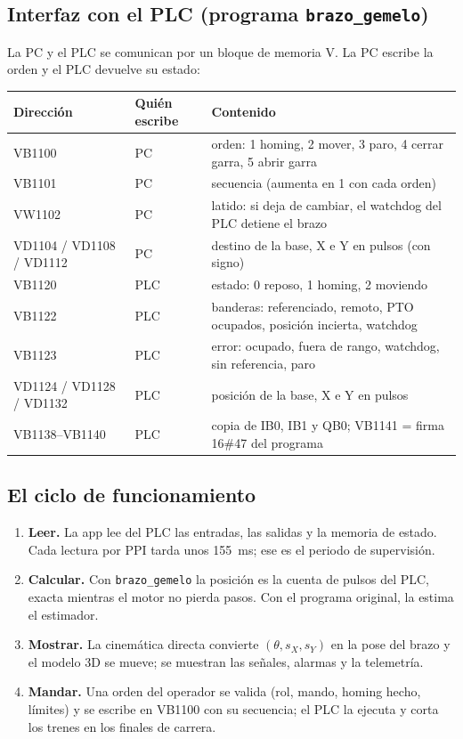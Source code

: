 \documentclass[11pt,a4paper]{article}
\newcommand{\codigo}[1]{\texttt{#1}}
\begin{document}
\subsection{Interfaz con el PLC (programa \codigo{brazo\_gemelo})}
La PC y el PLC se comunican por un bloque de memoria V. La PC escribe la orden y el PLC devuelve su estado:
\begin{center}\small
\begin{tabular}{l l l}
\toprule
\textbf{Dirección} & \textbf{Quién escribe} & \textbf{Contenido}\\
\midrule
VB1100 & PC & orden: 1 homing, 2 mover, 3 paro, 4 cerrar garra, 5 abrir garra\\
VB1101 & PC & secuencia (aumenta en 1 con cada orden)\\
VW1102 & PC & latido: si deja de cambiar, el watchdog del PLC detiene el brazo\\
VD1104 / VD1108 / VD1112 & PC & destino de la base, X e Y en pulsos (con signo)\\
VB1120 & PLC & estado: 0 reposo, 1 homing, 2 moviendo\\
VB1122 & PLC & banderas: referenciado, remoto, PTO ocupados, posición incierta, watchdog\\
VB1123 & PLC & error: ocupado, fuera de rango, watchdog, sin referencia, paro\\
VD1124 / VD1128 / VD1132 & PLC & posición de la base, X e Y en pulsos\\
VB1138--VB1140 & PLC & copia de IB0, IB1 y QB0; VB1141 = firma 16\#47 del programa\\
\bottomrule
\end{tabular}
\end{center}

\subsection{El ciclo de funcionamiento}
\begin{enumerate}
\item \textbf{Leer.} La app lee del PLC las entradas, las salidas y la memoria de estado. Cada lectura por PPI tarda unos 155~ms; ese es el periodo de supervisión.
\item \textbf{Calcular.} Con \codigo{brazo\_gemelo} la posición es la cuenta de pulsos del PLC, exacta mientras el motor no pierda pasos. Con el programa original, la estima el estimador.
\item \textbf{Mostrar.} La cinemática directa convierte $(\theta, s_X, s_Y)$ en la pose del brazo y el modelo 3D se mueve; se muestran las señales, alarmas y la telemetría.
\item \textbf{Mandar.} Una orden del operador se valida (rol, mando, homing hecho, límites) y se escribe en VB1100 con su secuencia; el PLC la ejecuta y corta los trenes en los finales de carrera.
\end{enumerate}
\end{document}
